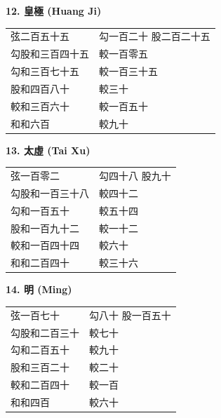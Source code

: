 \documentclass[11pt,a4paper]{article}
\begin{document}
\vspace{0.3cm}

\textbf{12. 皇極 (Huang Ji)}

\begin{center}
\begin{tabular}{ll}
弦二百五十五 & 勾一百二十 \quad 股二百二十五 \\
勾股和三百四十五 & 較一百零五 \\
勾和三百七十五 & 較一百三十五 \\
股和四百八十 & 較三十 \\
較和三百六十 & 較一百五十 \\
和和六百 & 較九十 \\
\end{tabular}
\end{center}

\vspace{0.3cm}

\textbf{13. 太虛 (Tai Xu)}

\begin{center}
\begin{tabular}{ll}
弦一百零二 & 勾四十八 \quad 股九十 \\
勾股和一百三十八 & 較四十二 \\
勾和一百五十 & 較五十四 \\
股和一百九十二 & 較一十二 \\
較和一百四十四 & 較六十 \\
和和二百四十 & 較三十六 \\
\end{tabular}
\end{center}

\vspace{0.3cm}

\textbf{14. 明 (Ming)}

\begin{center}
\begin{tabular}{ll}
弦一百七十 & 勾八十 \quad 股一百五十 \\
勾股和二百三十 & 較七十 \\
勾和二百五十 & 較九十 \\
股和三百二十 & 較二十 \\
較和二百四十 & 較一百 \\
和和四百 & 較六十 \\
\end{tabular}
\end{center}

\vspace{0.3cm}
\end{document}
